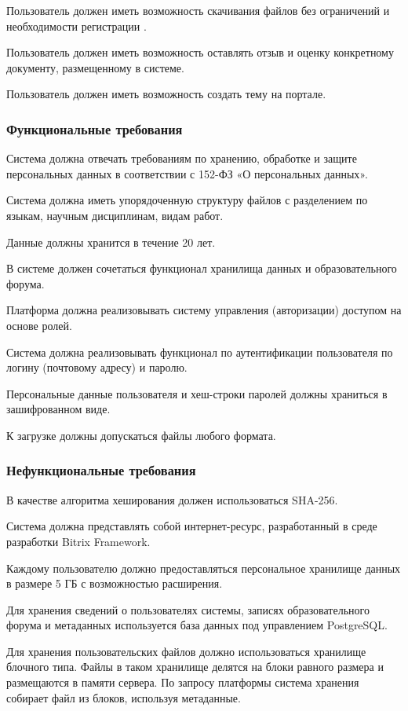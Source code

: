 \documentclass[a4paper,14pt]{extarticle}
\begin{document}
Пользователь должен иметь возможность скачивания файлов без ограничений и необходимости регистрации .

Пользователь должен иметь возможность оставлять отзыв и оценку конкретному документу, размещенному в системе.

Пользователь должен иметь возможность создать тему на портале.

\subsubsection{Функциональные требования}

Система должна отвечать требованиям по хранению, обработке и защите персональных данных в соответствии с 152-ФЗ «О персональных данных».

Система должна иметь упорядоченную структуру файлов с разделением по языкам, научным дисциплинам, видам работ.

Данные должны хранится в течение 20 лет.

В системе должен сочетаться функционал хранилища данных и образовательного форума.

Платформа должна реализовывать систему управления (авторизации) доступом на основе ролей.

Система должна реализовывать функционал по аутентификации пользователя по логину (почтовому адресу) и паролю.

Персональные данные пользователя и хеш-строки паролей должны храниться в зашифрованном виде.

К загрузке должны допускаться файлы любого формата.

\subsubsection{Нефункциональные требования}

В качестве алгоритма хеширования должен использоваться SHA-256.

Система должна представлять собой интернет-ресурс, разработанный в среде разработки Bitrix Framework.

Каждому пользователю должно предоставляться персональное хранилище данных в размере 5 ГБ с возможностью расширения. 

Для хранения сведений о пользователях системы, записях образовательного форума и метаданных используется база данных под управлением PostgreSQL.

Для хранения пользовательских файлов должно использоваться хранилище блочного типа. Файлы в таком хранилище делятся на блоки равного размера и размещаются в памяти сервера. По запросу платформы система хранения собирает файл из блоков, используя метаданные.
\end{document}
